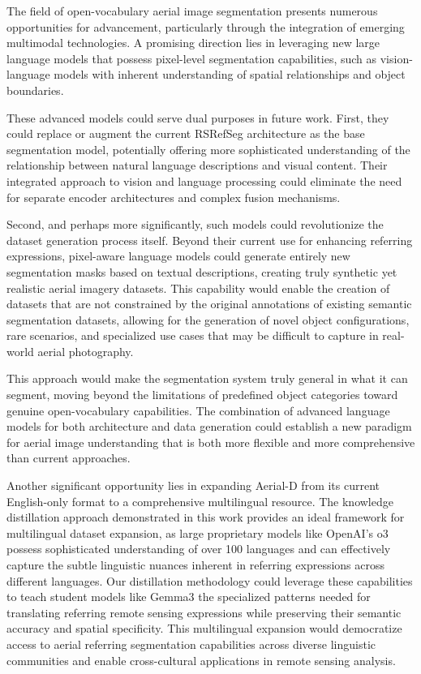 The field of open-vocabulary aerial image segmentation presents numerous opportunities for advancement, particularly through the integration of emerging multimodal technologies. A promising direction lies in leveraging new large language models that possess pixel-level segmentation capabilities, such as vision-language models with inherent understanding of spatial relationships and object boundaries.

These advanced models could serve dual purposes in future work. First, they could replace or augment the current RSRefSeg architecture as the base segmentation model, potentially offering more sophisticated understanding of the relationship between natural language descriptions and visual content. Their integrated approach to vision and language processing could eliminate the need for separate encoder architectures and complex fusion mechanisms.

Second, and perhaps more significantly, such models could revolutionize the dataset generation process itself. Beyond their current use for enhancing referring expressions, pixel-aware language models could generate entirely new segmentation masks based on textual descriptions, creating truly synthetic yet realistic aerial imagery datasets. This capability would enable the creation of datasets that are not constrained by the original annotations of existing semantic segmentation datasets, allowing for the generation of novel object configurations, rare scenarios, and specialized use cases that may be difficult to capture in real-world aerial photography.

This approach would make the segmentation system truly general in what it can segment, moving beyond the limitations of predefined object categories toward genuine open-vocabulary capabilities. The combination of advanced language models for both architecture and data generation could establish a new paradigm for aerial image understanding that is both more flexible and more comprehensive than current approaches.

Another significant opportunity lies in expanding Aerial-D from its current English-only format to a comprehensive multilingual resource. The knowledge distillation approach demonstrated in this work provides an ideal framework for multilingual dataset expansion, as large proprietary models like OpenAI's o3 possess sophisticated understanding of over 100 languages and can effectively capture the subtle linguistic nuances inherent in referring expressions across different languages. Our distillation methodology could leverage these capabilities to teach student models like Gemma3 the specialized patterns needed for translating referring remote sensing expressions while preserving their semantic accuracy and spatial specificity. This multilingual expansion would democratize access to aerial referring segmentation capabilities across diverse linguistic communities and enable cross-cultural applications in remote sensing analysis.

